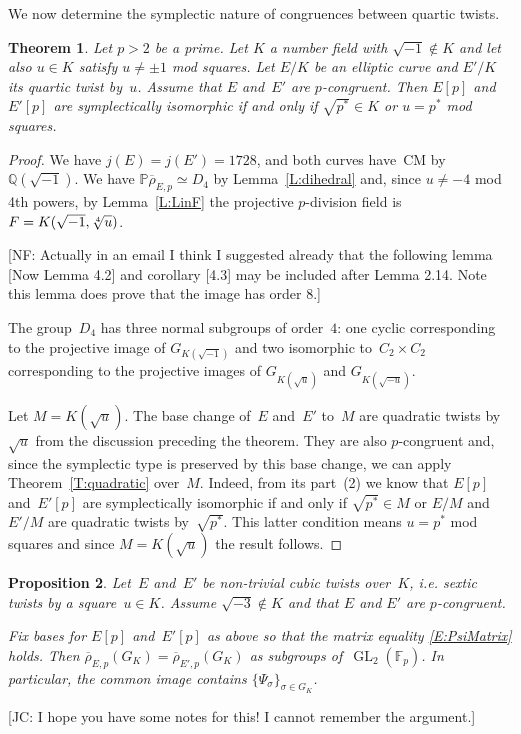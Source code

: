 \documentclass[12pt, reqno]{amsart}
\newcommand{\F}{\mathbb{F}}
\newcommand{\PP}{\mathbb{P}}
\newcommand{\Q}{\mathbb{Q}}
\newcommand{\rhobar}{{\overline{\rho}}}
\newcommand{\GL}{\operatorname{GL}}
\numberwithin{equation}{section}
\newtheorem{theorem}{Theorem}[section]
\newtheorem{proposition}[theorem]{Proposition}
\theoremstyle{definition}
\theoremstyle{remark}
\newcommand{\nf}[1]{{\color{blue} \textsf{[NF: #1]}}}
\newcommand{\jc}[1]{{\color{darkgreen} \textsf{[JC: #1]}}}
\begin{document}
We now determine the symplectic nature of congruences between quartic
twists.

\begin{theorem}\label{T:quarticM} 
Let $p > 2$ be a prime. Let $K$ a number field with $\sqrt{-1} \not\in K$ and let also $u \in K$ satisfy $u \neq \pm 1$ mod squares. 
Let $E/K$ be an elliptic curve and $E'/K$
its quartic twist by~$u$.
Assume that $E$ and~$E'$ are $p$-congruent.
Then $E[p]$ and~$E'[p]$ are symplectically isomorphic if and only if
$\sqrt{p^*} \in K$ or $u = p^*$ mod squares.
\end{theorem}

\begin{proof} 
We have $j(E)=j(E')=1728$, and both curves have~CM by
$\Q(\sqrt{-1})$. We have $\PP \rhobar_{E,p} \simeq D_4$ by
Lemma~\ref{L:dihedral} and, since $u \neq -4$ mod 4th powers, by
Lemma~\ref{L:LinF} the projective $p$-division field is $F =
K(\sqrt{-1},\root 4 \of u)$.

\nf{Actually in an email I think I suggested already that the
  following lemma [Now Lemma 4.2] and corollary [4.3] may be included
  after Lemma 2.14. Note this lemma does prove that the image has
  order 8.}
  
The group~$D_4$ has three normal subgroups of order~$4$: one cyclic corresponding to the projective image of $G_{K(\sqrt{-1})}$ and two isomorphic to~$C_2 \times C_2$ corresponding to the projective images of
$G_{K(\sqrt{u})}$ and $G_{K(\sqrt{-u})}$.

Let $M = K(\sqrt{u})$. 
The base change of~$E$ and~$E'$  
to~$M$ are quadratic twists by~$\sqrt{u}$ from the discussion preceding the theorem. They are also $p$-congruent and,  since the 
symplectic type is preserved by this base change, we can apply Theorem~\ref{T:quadratic} over~$M$.  
Indeed, from its part~(2) we know that
$E[p]$ and~$E'[p]$ are symplectically isomorphic if and only if $\sqrt{p^*} \in M$ 
or $E/M$ and $E'/M$ are quadratic twists by~$\sqrt{p^*}$. 
This latter condition means $u = p^*$ mod squares and since $M = K(\sqrt{u})$ the result follows.
\end{proof}


\begin{proposition} \label{P:PsiInImage}
Let~$E$ and~$E'$ be non-trivial cubic twists over~$K$, i.e. sextic twists by a square~$u \in K$. Assume $\sqrt{-3} \not\in K$ and that $E$ and $E'$ are $p$-congruent.

Fix bases for $E[p]$ and~$E'[p]$ as above so that the matrix equality \eqref{E:PsiMatrix} holds. Then 
$\rhobar_{E,p}(G_K) = \rhobar_{E',p}(G_K)$ 
as subgroups of~$\GL_2(\F_p)$. In particular, the common image contains $\{ \Psi_\sigma \}_{\sigma \in G_K}$.
\end{proposition}
\jc{I hope you have some notes for this!  I cannot remember the argument.}
\end{document}
